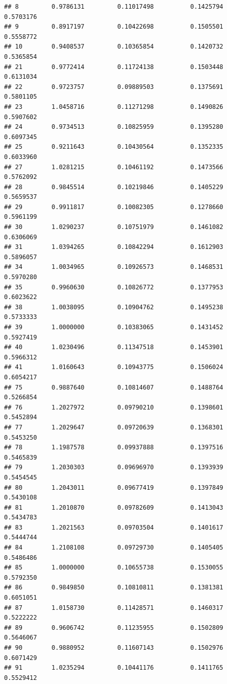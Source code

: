 \documentclass[]{article}
\begin{document}
\begin{verbatim}
## 8         0.9786131         0.11017498          0.1425794        0.5703176
## 9         0.8917197         0.10422698          0.1505501        0.5558772
## 10        0.9408537         0.10365854          0.1420732        0.5365854
## 21        0.9772414         0.11724138          0.1503448        0.6131034
## 22        0.9723757         0.09889503          0.1375691        0.5801105
## 23        1.0458716         0.11271298          0.1490826        0.5907602
## 24        0.9734513         0.10825959          0.1395280        0.6097345
## 25        0.9211643         0.10430564          0.1352335        0.6033960
## 27        1.0281215         0.10461192          0.1473566        0.5762092
## 28        0.9845514         0.10219846          0.1405229        0.5659537
## 29        0.9911817         0.10082305          0.1278660        0.5961199
## 30        1.0290237         0.10751979          0.1461082        0.6306069
## 31        1.0394265         0.10842294          0.1612903        0.5896057
## 34        1.0034965         0.10926573          0.1468531        0.5970280
## 35        0.9960630         0.10826772          0.1377953        0.6023622
## 38        1.0038095         0.10904762          0.1495238        0.5733333
## 39        1.0000000         0.10383065          0.1431452        0.5927419
## 40        1.0230496         0.11347518          0.1453901        0.5966312
## 41        1.0160643         0.10943775          0.1506024        0.6054217
## 75        0.9887640         0.10814607          0.1488764        0.5266854
## 76        1.2027972         0.09790210          0.1398601        0.5452894
## 77        1.2029647         0.09720639          0.1368301        0.5453250
## 78        1.1987578         0.09937888          0.1397516        0.5465839
## 79        1.2030303         0.09696970          0.1393939        0.5454545
## 80        1.2043011         0.09677419          0.1397849        0.5430108
## 81        1.2010870         0.09782609          0.1413043        0.5434783
## 83        1.2021563         0.09703504          0.1401617        0.5444744
## 84        1.2108108         0.09729730          0.1405405        0.5486486
## 85        1.0000000         0.10655738          0.1530055        0.5792350
## 86        0.9849850         0.10810811          0.1381381        0.6051051
## 87        1.0158730         0.11428571          0.1460317        0.5222222
## 89        0.9606742         0.11235955          0.1502809        0.5646067
## 90        0.9880952         0.11607143          0.1502976        0.6071429
## 91        1.0235294         0.10441176          0.1411765        0.5529412

\end{verbatim}
\end{document}

